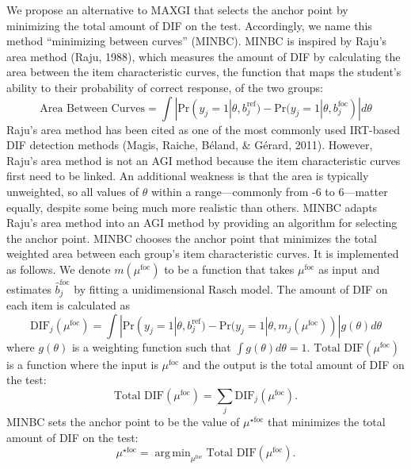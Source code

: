 \documentclass[
  english,
  man,floatsintext]{apa6}
\begin{document}
We propose an alternative to MAXGI that selects the anchor point by minimizing the total amount of DIF on the test. Accordingly, we name this method ``minimizing between curves'' (MINBC). MINBC is inspired by Raju's area method (Raju, 1988), which measures the amount of DIF by calculating the area between the item characteristic curves, the function that maps the student's ability to their probability of correct response, of the two groups:
\begin{equation}
\text{Area Between Curves} = \int |\text{Pr}(y_j = 1| \theta, b_j^{\text{ref}}) - \text{Pr}(y_j = 1| \theta, b_j^{\text{foc}})| d\theta
\end{equation}
Raju's area method has been cited as one of the most commonly used IRT-based DIF detection methods (Magis, Raiche, Béland, \& Gérard, 2011). However, Raju's area method is not an AGI method because the item characteristic curves first need to be linked. An additional weakness is that the area is typically unweighted, so all values of \(\theta\) within a range---commonly from -6 to 6---matter equally, despite some being much more realistic than others.
MINBC adapts Raju's area method into an AGI method by providing an algorithm for selecting the anchor point. MINBC chooses the anchor point that minimizes the total weighted area between each group's item characteristic curves. It is implemented as follows. We denote \(m(\mu^\text{foc})\) to be a function that takes \(\mu^\text{foc}\) as input and estimates \(\hat b_j^\text{foc}\) by fitting a unidimensional Rasch model. The amount of DIF on each item is calculated as
\begin{equation}
\text{DIF}_j(\mu^\text{foc}) = \int |\text{Pr}(y_j = 1| \theta, b_j^{\text{ref}}) - \text{Pr}(y_j = 1| \theta, m_j(\mu^\text{foc}))| g(\theta)d\theta
\end{equation}
where \(g(\theta)\) is a weighting function such that \(\int g(\theta)d\theta = 1\). \(\text{Total DIF}(\mu^\text{foc})\) is a function where the input is \(\mu^\text{foc}\) and the output is the total amount of DIF on the test:
\begin{equation}
\text{Total DIF}(\mu^\text{foc}) = \sum_{j} \text{DIF}_j(\mu^\text{foc}).
\end{equation}
MINBC sets the anchor point to be the value of \(\mu^{\star\text{foc}}\) that minimizes the total amount of DIF on the test:
\begin{equation}
\mu^{\star\text{foc}} = \mathop{\mathrm{arg\,min}}_{\mu^\text{foc}} \text{Total DIF}(\mu^\text{foc}).
\end{equation}
\end{document}

